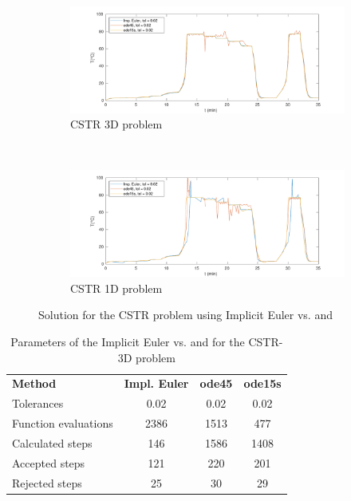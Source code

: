 \begin{figure}[H]
    \centering
    \begin{subfigure}{0.8\linewidth}
        \centering
        \includegraphics[width=1\linewidth]{images/3/3_6_3D.pdf} 
        \caption{CSTR 3D problem}
    \end{subfigure} \\
    \begin{subfigure}{0.8\linewidth}
        \centering
        \includegraphics[width=1\linewidth]{images/3/3_6_1D.pdf}
        \caption{CSTR 1D problem}
    \end{subfigure}
    \caption{Solution for the CSTR problem using Implicit Euler vs.  and }
    \label{3_6_3D_1D}
\end{figure}

\begin{table}[H]
    \centering
    \begin{tabular}{@{}l|c|c|c@{}}
    \toprule
    \textbf{Method}      & \textbf{Impl. Euler} & \textbf{ode45} & \textbf{ode15s} \\
    Tolerances           & 0.02                 & 0.02           & 0.02            \\ \midrule
    Function evaluations & 2386                 & 1513           & 477             \\
    Calculated steps     & 146                  & 1586           & 1408            \\
    Accepted steps       & 121                  & 220            & 201             \\
    Rejected steps       & 25                   & 30             & 29              \\ \bottomrule
    \end{tabular}
    \caption{Parameters of the Implicit Euler vs.  and  for the CSTR-3D problem}
    \label{3_6_3D_table}
\end{table}

